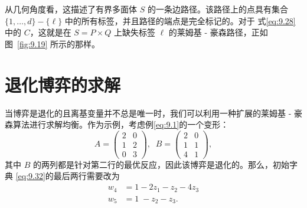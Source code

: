 从几何角度看，这描述了有界多面体 \(S\) 的一条边路径。该路径上的点具有集合\(\{ 1,\ldots,d\}  - \{ \ell \}\) 中的所有标签，并且路径的端点是完全标记的。对于 式\eqref{eq:9.28}  中的 \(C\)，这就是在 \(S = P \times  Q\) 上缺失标签 \(\ell\) 的莱姆基 - 豪森路径，正如图~\ref{fig:9.19} 所示的那样。


\section{退化博弈的求解}    \label{sec9.8}

当博弈是退化的且离基变量并不总是唯一时，我们可以利用一种扩展的莱姆基 - 豪森算法进行求解均衡。作为示例，考虑例\eqref{eq:9.1}的一个变形：
\begin{equation}
\label{eq:9.39}
A = \left( \begin{array}{ll} 2 & 0 \\  1 & 2 \\  0 & 3 \end{array}\right), \;\;B = \left( \begin{array}{ll} 2 & 0 \\  1 & 1 \\  4 & 1 \end{array}\right),
\end{equation}
其中 \(B\) 的两列都是针对第二行的最优反应，因此该博弈是退化的。那么，初始字典 \eqref{eq:9.32}的最后两行需要改为
\begin{equation}
\label{eq:9.40}
\begin{aligned}
{w}_{4} & = 1 - 2{z}_{1} - {z}_{2} - 4{z}_{3} \\
{w}_{5} & = 1\; - {z}_{2} - {z}_{3}.
\end{aligned}
\end{equation}

